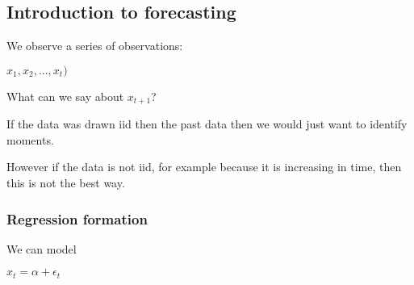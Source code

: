 
\subsection{Introduction to forecasting}

We observe a series of observations:

\(x_1, x_2,...,x_t)\)

What can we say about \(x_{t+1}\)?

If the data was drawn iid then the past data then we would just want to identify moments.

However if the data is not iid, for example because it is increasing in time, then this is not the best way.

\subsubsection{Regression formation}

We can model

\(x_t=\alpha + \epsilon_t \)



